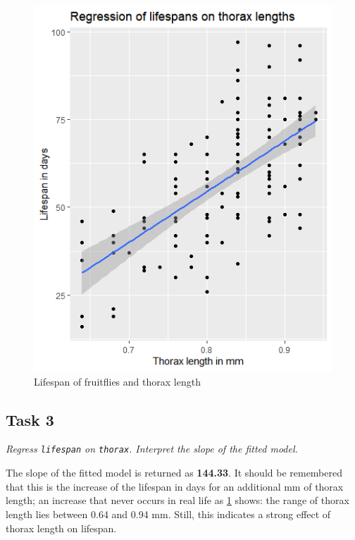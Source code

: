 \documentclass[12pt,a4paper]{article}
\begin{document}
\begin{figure}[h]
	\centering
	\includegraphics[width=\textwidth]{plot2}
	\caption{Lifespan of fruitflies and thorax length}
	\label{fig:thoraxlength}
\end{figure}

\subsection*{Task 3}
\textit{Regress \texttt{lifespan} on \texttt{thorax}.  Interpret the slope of the fitted model.}



The slope of the fitted model is returned as \textbf{144.33}. It should be remembered that this is the increase of the lifespan in days for an additional mm of thorax length; an increase that never occurs in real life as \ref*{fig:thoraxlength} shows: the range of thorax length lies between 0.64 and 0.94 mm. Still, this indicates a strong effect of thorax length on lifespan.
\end{document}
